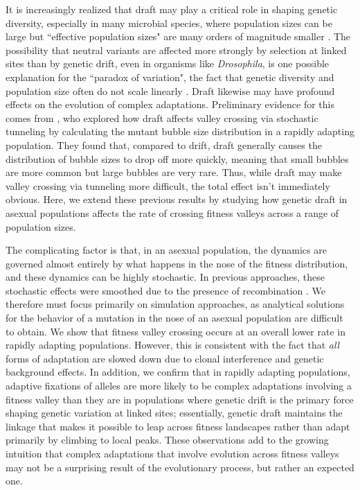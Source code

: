 \documentclass[10pt,twocolumn,twoside]{gsajnl}
\begin{document}
\begin{spacing}{1.5}
It is increasingly realized that draft may play a critical role in shaping genetic diversity, especially in many microbial species, where population sizes can be large but ``effective population sizes" are many orders of magnitude smaller \citep{masel_2011}.
The possibility that neutral variants are affected more strongly by selection at linked sites than by genetic drift, even in organisms like \emph{Drosophila}, is one possible explanation for the ``paradox of variation", the fact that genetic diversity and population size often do not scale linearly \citep{gillespie_2000, gillespie_2001, neher_kessinger_2013, corbett-detig_2015}.
Draft likewise may have profound effects on the evolution of complex adaptations. Preliminary evidence for this comes from
\citet{neher_shraiman_2011}, who explored how draft affects valley crossing via stochastic tunneling by calculating the mutant bubble size distribution in a rapidly adapting population.
They found that, compared to drift, draft generally causes the distribution of bubble sizes to drop off more quickly, meaning that small bubbles are more common but large bubbles are very rare.
Thus, while draft may make valley crossing via tunneling more difficult, the total effect isn't immediately obvious.
Here, we extend these previous results by studying how genetic draft in asexual populations affects the rate of crossing fitness valleys across a range of population sizes.

The complicating factor is that, in an asexual population, the dynamics are governed almost entirely by what happens in the nose of the fitness distribution, and these dynamics can be highly stochastic. In previous approaches, these stochastic effects were smoothed due to the presence of recombination \citep{neher_shraiman_2011, neher_shraiman_2009}.
We therefore must focus primarily on simulation approaches, as analytical solutions for the behavior of a mutation in the nose of an asexual population are difficult to obtain.
We show that fitness valley crossing occurs at an overall lower rate in rapidly adapting populations.
However, this is consistent with the fact that \emph{all} forms of adaptation are slowed down due to clonal interference and genetic background effects.
In addition, we confirm that in rapidly adapting populations, adaptive fixations of alleles are more likely to be complex adaptations involving a fitness valley than they are in populations where genetic drift is the primary force shaping genetic variation at linked sites; essentially, genetic draft maintains the linkage that makes it possible to leap across fitness landscapes rather than adapt primarily by climbing to local peaks.
These observations add to the growing intuition that complex adaptations that involve evolution across fitness valleys may not be a surprising result of the evolutionary process, but rather an expected one.


\end{spacing}
\end{document}
